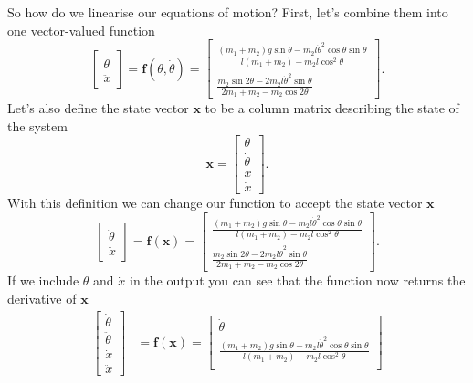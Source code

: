 \documentclass{article}
\renewcommand{\vec}[1]{\boldsymbol{\mathbf{#1}}}
\begin{document}
So how do we linearise our equations of motion? First, let's combine them into one vector-valued function \[\begin{bmatrix}
    \ddot{\theta} \\
    \ddot{x}
  \end{bmatrix} = \vec{f}(\theta, \dot{\theta}) = \begin{bmatrix}
    \frac{(m_1 + m_2) g \sin \theta - m_2 l \dot{\theta}^2 \cos \theta \sin \theta}{l (m_1 + m_2) - m_2 l \cos^2 \theta} \\
    \frac{m_2 \sin 2 \theta - 2 m_2 l \dot{\theta}^2 \sin \theta}{2 m_1 + m_2 - m_2 \cos 2 \theta}
\end{bmatrix}.\] Let's also define the state vector $\vec{x}$ to be a column matrix describing the state of the system \[\vec{x} = \begin{bmatrix} \theta \\ \dot{\theta} \\ x \\ \dot{x} \end{bmatrix}.\] With this definition we can change our function to accept the state vector $\vec{x}$ \[\begin{bmatrix}
    \ddot{\theta} \\
    \ddot{x}
  \end{bmatrix} = \vec{f}(\vec{x}) = \begin{bmatrix}
    \frac{(m_1 + m_2) g \sin \theta - m_2 l \dot{\theta}^2 \cos \theta \sin \theta}{l (m_1 + m_2) - m_2 l \cos^2 \theta} \\
    \frac{m_2 \sin 2 \theta - 2 m_2 l \dot{\theta}^2 \sin \theta}{2 m_1 + m_2 - m_2 \cos 2 \theta}
  \end{bmatrix}.\] If we include $\dot{\theta}$ and $\dot{x}$ in the output you can see that the function now returns the derivative of $\vec{x}$ \begin{align*}
  \begin{bmatrix}
    \dot{\theta}  \\
    \ddot{\theta} \\
    \dot{x}       \\
    \ddot{x}
  \end{bmatrix} & = \vec{f}(\vec{x}) = \begin{bmatrix}
                                         \dot{\theta}                                                                                                         \\
                                         \frac{(m_1 + m_2) g \sin \theta - m_2 l \dot{\theta}^2 \cos \theta \sin \theta}{l (m_1 + m_2) - m_2 l \cos^2 \theta} \\

\end{bmatrix}
\end{align*}
\end{document}
